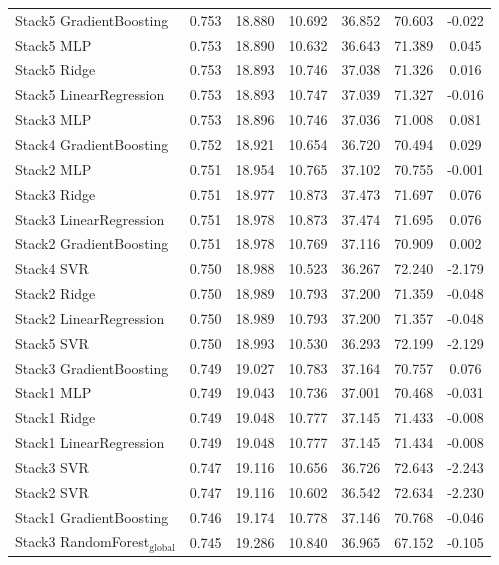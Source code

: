 \begin{table}[tp]
{\begin{tabular}{p{4.5cm}cccccc}
        Stack5 GradientBoosting & 0.753 & 18.880 & 10.692 & 36.852 & 70.603 & -0.022 \\
        Stack5 MLP & 0.753 & 18.890 & 10.632 & 36.643 & 71.389 & 0.045 \\
        Stack5 Ridge & 0.753 & 18.893 & 10.746 & 37.038 & 71.326 & 0.016 \\
        Stack5 LinearRegression & 0.753 & 18.893 & 10.747 & 37.039 & 71.327 & -0.016 \\
        Stack3 MLP & 0.753 & 18.896 & 10.746 & 37.036 & 71.008 & 0.081 \\
        Stack4 GradientBoosting & 0.752 & 18.921 & 10.654 & 36.720 & 70.494 & 0.029 \\
        Stack2 MLP & 0.751 & 18.954 & 10.765 & 37.102 & 70.755 & -0.001 \\
        Stack3 Ridge & 0.751 & 18.977 & 10.873 & 37.473 & 71.697 & 0.076 \\
        Stack3 LinearRegression & 0.751 & 18.978 & 10.873 & 37.474 & 71.695 & 0.076 \\
        Stack2 GradientBoosting & 0.751 & 18.978 & 10.769 & 37.116 & 70.909 & 0.002 \\
        Stack4 SVR & 0.750 & 18.988 & 10.523 & 36.267 & 72.240 & -2.179 \\
        Stack2 Ridge & 0.750 & 18.989 & 10.793 & 37.200 & 71.359 & -0.048 \\
        Stack2 LinearRegression & 0.750 & 18.989 & 10.793 & 37.200 & 71.357 & -0.048 \\
        Stack5 SVR & 0.750 & 18.993 & 10.530 & 36.293 & 72.199 & -2.129 \\
        Stack3 GradientBoosting & 0.749 & 19.027 & 10.783 & 37.164 & 70.757 & 0.076 \\
        Stack1 MLP & 0.749 & 19.043 & 10.736 & 37.001 & 70.468 & -0.031 \\
        Stack1 Ridge & 0.749 & 19.048 & 10.777 & 37.145 & 71.433 & -0.008 \\
        Stack1 LinearRegression & 0.749 & 19.048 & 10.777 & 37.145 & 71.434 & -0.008 \\
        Stack3 SVR & 0.747 & 19.116 & 10.656 & 36.726 & 72.643 & -2.243 \\
        Stack2 SVR & 0.747 & 19.116 & 10.602 & 36.542 & 72.634 & -2.230 \\
        Stack1 GradientBoosting & 0.746 & 19.174 & 10.778 & 37.146 & 70.768 & -0.046 \\
        Stack3 RandomForest$_{\text{global}}$ & 0.745 & 19.286 & 10.840 & 36.965 & 67.152 & -0.105 \\

\end{tabular}}
\end{table}
